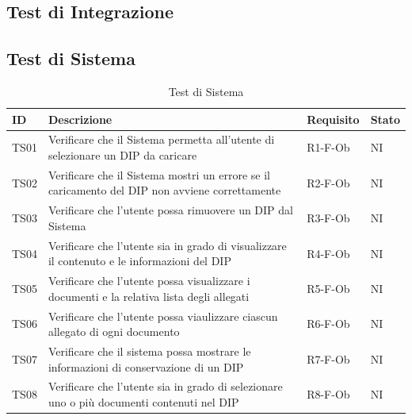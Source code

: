 \documentclass[a4paper,12pt]{article}
\begin{document}
        \subsection{Test di Integrazione}

        \subsection{Test di Sistema}
                   \begin{longtable}{|M{1.2cm}|M{6.3cm}|M{2.5cm}|M{1.5cm}|}
                
                \caption{Test di Sistema} \\
                \hline
                \textbf{ID} & \textbf{Descrizione} & \textbf{Requisito} & \textbf{Stato} \\
                \hline
                \endhead

                TS01 & Verificare che il Sistema permetta all'utente di selezionare un DIP da caricare& R1-F-Ob & NI \\
                \hline

                TS02 & Verificare che il Sistema mostri un errore se il caricamento del DIP non avviene correttamente & R2-F-Ob & NI \\
                \hline

                TS03 & Verificare che l'utente possa rimuovere un DIP dal Sistema & R3-F-Ob & NI \\
                \hline

                TS04 & Verificare che l'utente sia in grado di visualizzare il contenuto e le informazioni del DIP & R4-F-Ob & NI \\
                \hline

                TS05 & Verificare che l'utente possa visualizzare i documenti e la relativa lista degli allegati & R5-F-Ob & NI \\
                \hline

                TS06 & Verificare che l'utente possa viaulizzare ciascun allegato di ogni documento & R6-F-Ob & NI \\
                \hline

                TS07 & Verificare che il sistema possa mostrare le informazioni di conservazione di un DIP & R7-F-Ob & NI \\
                \hline

                TS08 & Verificare che l'utente sia in grado di selezionare uno o più documenti contenuti nel DIP & R8-F-Ob & NI \\
                \hline


\end{longtable}
\end{document}
